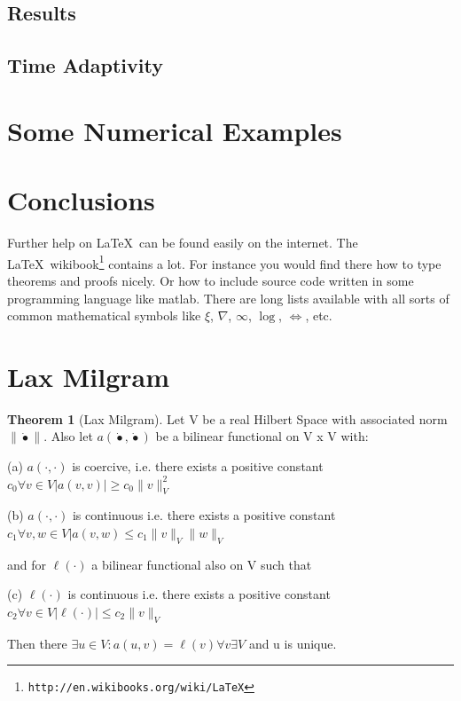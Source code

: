 \documentclass{uonmathreport}
\theoremstyle{definition}
\theoremstyle{problem}
\theoremstyle{theorem}
\newtheorem{theorem}{Theorem}[section]
\begin{document}
\subsection{Results} \label{subsec:results3}

\subsection{Time Adaptivity} \label{subsubsec:Time Adaptivity}

\newpage

\section{Some Numerical Examples} \label{sec:Examples}

\newpage


\section{Conclusions} \label{sec:conclusions}

Further help on \LaTeX\ can be found easily on the internet. The \LaTeX\
wikibook\footnote{\tt http://en.wikibooks.org/wiki/LaTeX} contains a lot.
For instance you would find there how to type theorems and proofs nicely.
Or how to include source code written in some programming language like
matlab. There are long lists available with all sorts of common
mathematical symbols like $\xi$, $\nabla$, $\infty$, $\log$, $\iff$, etc.

\newpage

\appendix

\section{Lax Milgram} \label{app:LM}

\begin{theorem}[Lax Milgram]
Let V be a real Hilbert Space with associated norm $\|\dot{•}\|$. Also let $a(\dot{•}, \dot{•})$ be a bilinear functional on V x V with:

(a) $a(\cdot, \cdot)$ is coercive, i.e. there exists a positive constant $c_0 \forall v \in V |a(v, v)|  \geq c_0 \|v\|^2_V$ 

(b) $a(\cdot, \cdot)$ is continuous i.e. there exists a positive constant $c_1 \forall v, w \in V |a(v, w) \leq c_1 \|v\|_V \|w\|_V$ 

and for $\ell(\cdot)$ a bilinear functional also on V such that 

(c) $\ell(\cdot)$ is continuous i.e. there exists a positive constant $c_2 \forall v \in V |\ell(\cdot)|  \leq c_2 \|v\|_V$

Then there $\exists u \in V: a(u, v) = \ell(v) \forall v \exists V$ and u is unique.
\end{theorem}
\end{document}
